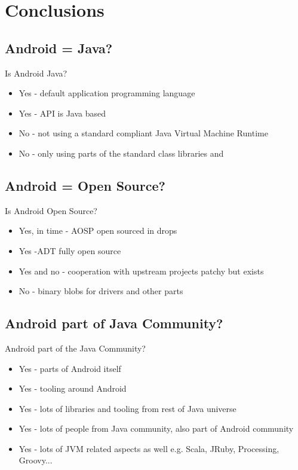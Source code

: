 \documentclass[aspectratio=169]{beamer}
\begin{document}
\section{Conclusions}

  \subsection{Android = Java?}
    \begin{frame}{Is Android Java?}
      \begin{itemize}
      \item<1-> Yes - default application programming language
      \item<2-> Yes - API is Java based
      \item<3-> No - not using a standard compliant Java Virtual Machine Runtime
      \item<4-> No - only using parts of the standard class libraries and 
      \end{itemize}
    \end{frame}

  \subsection{Android = Open Source?}
    \begin{frame}{Is Android Open Source?}
      \begin{itemize}
       \item<1-> Yes, in time - AOSP open sourced in drops
       \item<2-> Yes -ADT fully open source
       \item<3-> Yes and no - cooperation with upstream projects patchy but exists
       \item<4-> No - binary blobs for drivers and other parts
      \end{itemize}
    \end{frame}

  \subsection{Android part of Java Community?}
    \begin{frame}{Android part of the Java Community?}
     \begin{itemize}
      \item<1-> Yes - parts of Android itself
      \item<2-> Yes - tooling around Android
      \item<3-> Yes - lots of libraries and tooling from rest of Java universe
      \item<4-> Yes - lots of people from Java community, also part of Android community
      \item<5-> Yes - lots of JVM related aspects as well e.g. Scala, JRuby, Processing, Groovy...
      \end{itemize}
    \end{frame}
  
\end{document}
